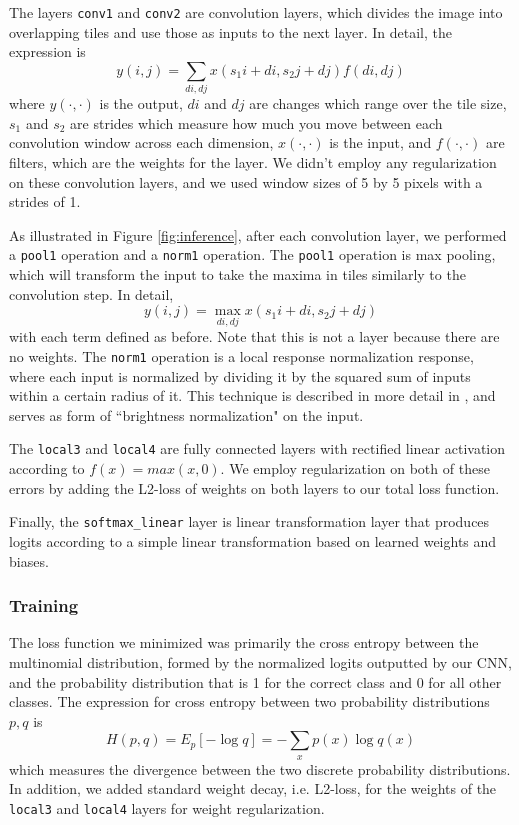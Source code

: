 \documentclass[11pt, twocolumn, twoside]{article}
\begin{document}
The layers \texttt{conv1} and \texttt{conv2} are convolution layers, which divides the image into overlapping tiles and use those as inputs to the next layer. In detail, the expression is
\[ y(i, j) = \sum_{di, dj} x(s_1i + di, s_2j + dj) f(di, dj)\]
where $y(\cdot, \cdot)$ is the output, $di$ and $dj$ are changes which range over the tile size, $s_1$ and $s_2$ are strides which measure how much you move between each convolution window across each dimension, $x(\cdot, \cdot)$ is the input, and $f(\cdot, \cdot)$ are filters, which are the weights for the layer. We didn't employ any regularization on these convolution layers, and we used window sizes of 5 by 5 pixels with a strides of 1.

As illustrated in Figure \ref{fig:inference}, after each convolution layer, we performed a \texttt{pool1} operation and a \texttt{norm1} operation. The \texttt{pool1} operation is max pooling, which will transform the input to take the maxima in tiles similarly to the convolution step. In detail,
\[ y(i, j) = \max_{di, dj} x(s_1i + di, s_2j + dj)\]
with each term defined as before. Note that this is not a layer because there are no weights. The \texttt{norm1} operation is a local response normalization response, where each input is normalized by dividing it by the squared sum of inputs within a certain radius of it. This technique is described in more detail in \cite{Krizhevsky}, and serves as form of ``brightness normalization" on the input.

The \texttt{local3} and \texttt{local4} are fully connected layers with rectified linear activation according to $f(x) = max(x, 0)$. We employ regularization on both of these errors by adding the L2-loss of weights on both layers to our total loss function. 

Finally, the \texttt{softmax\_linear} layer is linear transformation layer that produces logits according to a simple linear transformation based on learned weights and biases.

\subsubsection{Training}

The loss function we minimized was primarily the cross entropy between the multinomial distribution, formed by the normalized logits outputted by our CNN, and the probability distribution that is 1 for the correct class and 0 for all other classes. The expression for cross entropy between two probability distributions $p, q$ is
\[H(p, q) = E_p[-\log q] = -\sum_x p(x)\log q(x)\]
which measures the divergence between the two discrete probability distributions. In addition, we added standard weight decay, i.e. L2-loss, for the weights of the \texttt{local3} and \texttt{local4} layers for weight regularization.
\end{document}
